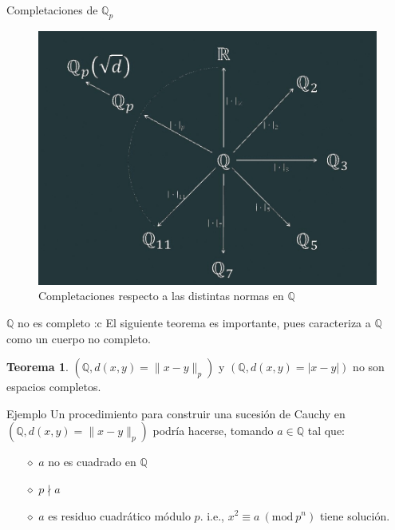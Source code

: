 \documentclass{beamer}
\theoremstyle{definition}
\numberwithin{equation}{section}
\newcommand{\orangee}[1]{\textcolor{thColor}{#1}}
\newtheorem{thh}{\orangee{Teorema}}
\newcommand{\Mod}[1]{\ (\mathrm{mod}\ #1)}
\newcommand{\Q}{\mathbb{Q}}
\newcommand{\Qp}{\mathbb{Q}_p}
\newcommand{\pnorm}[1]{\|#1\|_p}
\begin{document}
\begin{frame}{Completaciones de $\Qp$}
	\begin{figure}
		\includegraphics[scale=0.35]{img/relojBeamer.jpg}\caption{Completaciones respecto a las distintas normas en $\Q$}
	\end{figure}
\end{frame}
\begin{frame}{$\Q$ no es completo :c}
	El siguiente teorema es importante, pues caracteriza a $\Q$ como un cuerpo no completo.
	\begin{thh}
		$ (\Q, d (x,y)=\pnorm{x-y})$ y $ (\Q, d (x,y)=|x-y|)$ no son espacios completos.
	\end{thh}
\begin{exampleblock}{Ejemplo}
	Un procedimiento para construir una sucesión de Cauchy en $ (\Q, d (x,y)=\pnorm{x-y})$ podría hacerse, tomando $a\in\Q$ tal que:
	\begin{itemize}[<+- | alert@+>]
		\item[$\diamond$] $a$ no es cuadrado en $\Q$
		\item[$\diamond$] $p \nmid a$
		\item[$\diamond$] $a$ es residuo cuadrático módulo $p$. i.e., $x^2 \equiv a \Mod{p^n}$ tiene solución.
	\end{itemize}
\end{exampleblock}
\end{frame}
\end{document}
